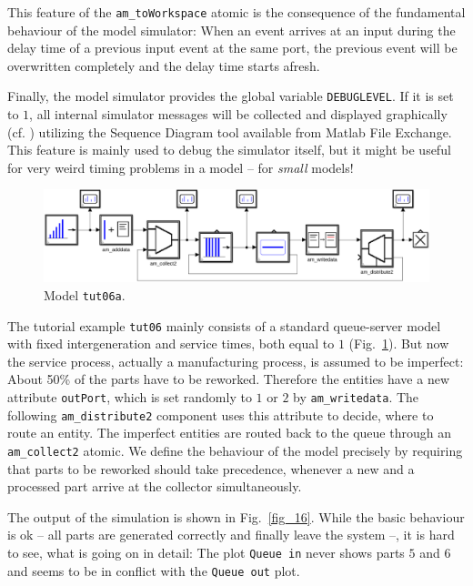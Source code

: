 \documentclass[12pt,oneside,a4paper,bibtotoc,BCOR=0pt,DIV=20]{scrreprt}
\newcommand{\cft}[1]{\mbox{\texttt{#1}}}   %
\begin{document}
This feature of the \cft{am\_toWorkspace} atomic is the consequence of the
fundamental behaviour of the model simulator: When an event arrives at an input
during the delay time of a previous input event at the same port, the previous
event will be overwritten completely and the delay time starts afresh. 
  
Finally, the model simulator provides the global variable \cft{DEBUGLEVEL}. If
it is set to $1$, all internal simulator messages will be collected and
displayed graphically (cf. \cite{nsaSimulator2}) utilizing the Sequence Diagram
tool available from Matlab File Exchange. This feature is mainly used to debug
the simulator itself, but it might be useful for very weird timing problems in
a model -- for \emph{small} models! \\

\begin{figure}[ht]
\centering
\includegraphics[width=0.88\columnwidth]{images/bild15.pdf}
\caption{Model \cft{tut06a}.}
\label{fig_15}
\end{figure}

The tutorial example \cft{tut06} mainly consists of a standard queue-server
model with fixed intergeneration and service times, both equal to $1$
(Fig.\ \ref{fig_15}). But now the service process, actually a manufacturing
process, is assumed to be imperfect: About 50\% of the parts have to be
reworked. Therefore the entities have a new attribute \cft{outPort}, which is
set randomly to $1$ or $2$ by \cft{am\_writedata}. The following
\cft{am\_distribute2} component uses this attribute to decide, where to route
an entity. The imperfect entities are routed back to the queue through an
\cft{am\_collect2} atomic. We define the behaviour of the model precisely by
requiring that parts to be reworked should take precedence, whenever a new and
a processed part arrive at the collector simultaneously.

The output of the simulation is shown in Fig.\ \ref{fig_16}. While the basic
behaviour is ok -- all parts are generated correctly and finally leave the
system --, it is hard to see, what is going on in detail: The plot \cft{Queue
  in} never shows parts $5$ and $6$ and seems to be in conflict with the
\cft{Queue out} plot.
\end{document}
